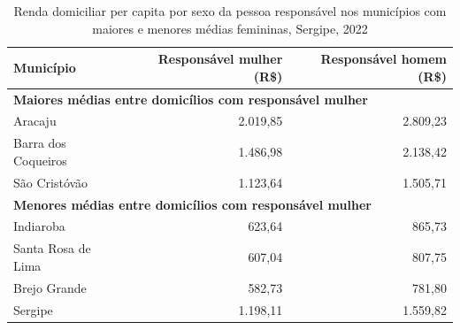\begin{table}[htbp]
\centering
\caption{Renda domiciliar per capita por sexo da pessoa responsável nos municípios com maiores e menores médias femininas, Sergipe, 2022}
\label{tab:item2-2-rdpc-sexo}
\small
\begin{tabular}{lrr}
\toprule
Município & Responsável mulher (R\$) & Responsável homem (R\$) \\
\midrule
\multicolumn{3}{l}{\textbf{Maiores médias entre domicílios com responsável mulher}} \\
Aracaju & 2.019,85 & 2.809,23 \\
Barra dos Coqueiros & 1.486,98 & 2.138,42 \\
São Cristóvão & 1.123,64 & 1.505,71 \\
\midrule
\multicolumn{3}{l}{\textbf{Menores médias entre domicílios com responsável mulher}} \\
Indiaroba & 623,64 & 865,73 \\
Santa Rosa de Lima & 607,04 & 807,75 \\
Brejo Grande & 582,73 & 781,80 \\
\midrule
Sergipe & 1.198,11 & 1.559,82 \\
\bottomrule
\end{tabular}
\end{table}

